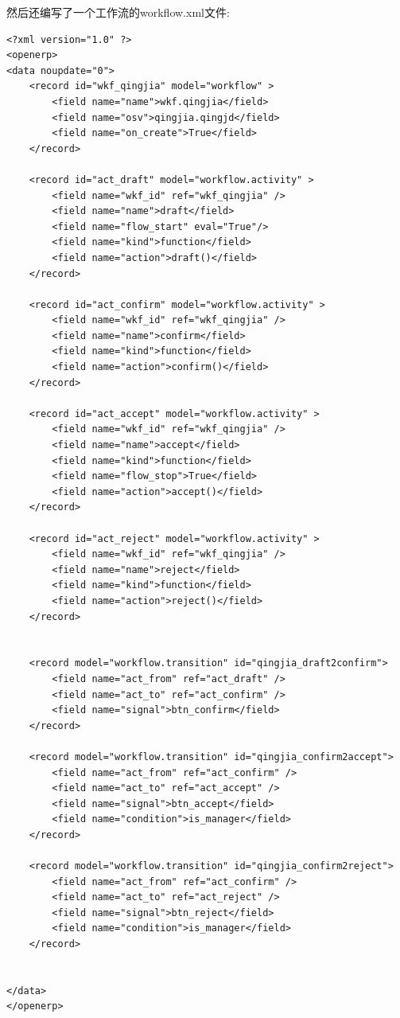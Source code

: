 \documentclass[11pt,a4paper]{sphinxmanual}
\begin{document}
然后还编写了一个工作流的workflow.xml文件:
\begin{verbatim}
<?xml version="1.0" ?>
<openerp>
<data noupdate="0">
    <record id="wkf_qingjia" model="workflow" >
        <field name="name">wkf.qingjia</field>
        <field name="osv">qingjia.qingjd</field>
        <field name="on_create">True</field>
    </record>

    <record id="act_draft" model="workflow.activity" >
        <field name="wkf_id" ref="wkf_qingjia" />
        <field name="name">draft</field>
        <field name="flow_start" eval="True"/>
        <field name="kind">function</field>
        <field name="action">draft()</field>
    </record>

    <record id="act_confirm" model="workflow.activity" >
        <field name="wkf_id" ref="wkf_qingjia" />
        <field name="name">confirm</field>
        <field name="kind">function</field>
        <field name="action">confirm()</field>
    </record>

    <record id="act_accept" model="workflow.activity" >
        <field name="wkf_id" ref="wkf_qingjia" />
        <field name="name">accept</field>
        <field name="kind">function</field>
        <field name="flow_stop">True</field>
        <field name="action">accept()</field>
    </record>

    <record id="act_reject" model="workflow.activity" >
        <field name="wkf_id" ref="wkf_qingjia" />
        <field name="name">reject</field>
        <field name="kind">function</field>
        <field name="action">reject()</field>
    </record>


    <record model="workflow.transition" id="qingjia_draft2confirm">
        <field name="act_from" ref="act_draft" />
        <field name="act_to" ref="act_confirm" />
        <field name="signal">btn_confirm</field>
    </record>

    <record model="workflow.transition" id="qingjia_confirm2accept">
        <field name="act_from" ref="act_confirm" />
        <field name="act_to" ref="act_accept" />
        <field name="signal">btn_accept</field>
        <field name="condition">is_manager</field>
    </record>

    <record model="workflow.transition" id="qingjia_confirm2reject">
        <field name="act_from" ref="act_confirm" />
        <field name="act_to" ref="act_reject" />
        <field name="signal">btn_reject</field>
        <field name="condition">is_manager</field>
    </record>


</data>
</openerp>
\end{verbatim}
\end{document}
